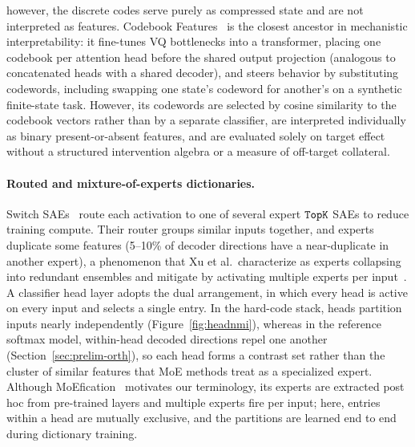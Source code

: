 however, the discrete codes serve purely as compressed state and are not
interpreted as features. Codebook Features~\cite{tamkin2023} is the
closest ancestor in mechanistic interpretability: it fine-tunes VQ
bottlenecks into a transformer, placing one codebook per attention head
before the shared output projection (analogous to concatenated heads with
a shared decoder), and steers behavior by substituting codewords,
including swapping one state's codeword for another's on a synthetic
finite-state task. However, its codewords are selected by cosine
similarity to the codebook vectors rather than by a separate classifier,
are interpreted individually as binary present-or-absent features, and
are evaluated solely on target effect without a structured intervention
algebra or a measure of off-target collateral.

\paragraph{Routed and mixture-of-experts dictionaries.}
Switch SAEs~\cite{mudide2025} route each activation to one of several
expert $\mathop{\mathtt{TopK}}\limits$ SAEs to reduce training compute. Their router groups
similar inputs together, and experts duplicate some features (5--10\% of
decoder directions have a near-duplicate in another expert), a phenomenon
that Xu et al.\ characterize as experts collapsing into redundant
ensembles and mitigate by activating multiple experts per
input~\cite{xu2025redundancydiversespecializedmultiexpert}. A classifier
head layer adopts the dual arrangement, in which every head is active on
every input and selects a single entry. In the hard-code stack, heads
partition inputs nearly independently (Figure~\ref{fig:headnmi}), whereas
in the reference softmax model, within-head decoded directions repel one
another (Section~\ref{sec:prelim-orth}), so each head forms a contrast
set rather than the cluster of similar features that MoE methods treat as
a specialized expert. Although MoEfication~\cite{zhang2022} motivates our
terminology, its experts are extracted post hoc from pre-trained layers
and multiple experts fire per input; here, entries within a head are
mutually exclusive, and the partitions are learned end to end during
dictionary training.

